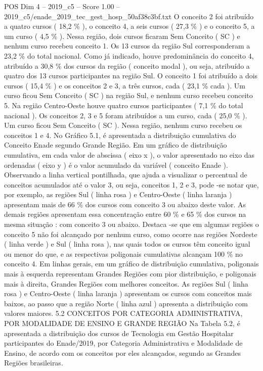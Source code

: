 \begin{textsample}{POS Dim 4 – 2019\_c5 – Score 1.00 – 2019\_c5/enade\_2019\_tec\_gest\_hosp\_50af38c3bf.txt}
O conceito 2 foi atribuído a quatro cursos ( 18,2 \% ), o conceito 4, a seis cursos ( 27,3 \% ) e o conceito 5, a um curso ( 4,5 \% ).
Nessa região, dois cursos ficaram Sem Conceito ( SC ) e nenhum curso recebeu conceito 1.
Os 13 cursos da região Sul corresponderam a 23,2 \% do total nacional.
Como já indicado, houve predominância do conceito 4, atribuído a 30,8 \% dos cursos da região ( conceito modal ), ou seja, atribuído a quatro dos 13 cursos participantes na região Sul.
O conceito 1 foi atribuído a dois cursos ( 15,4 \% ) e os conceitos 2 e 3, a três cursos, cada ( 23,1 \% cada ).
Um curso ficou Sem Conceito ( SC ) na região Sul, e nenhum curso recebeu conceito 5.
Na região Centro-Oeste houve quatro cursos participantes ( 7,1 \% do total nacional ).
Os conceitos 2, 3 e 5 foram atribuídos a um curso, cada ( 25,0 \% ).
Um curso ficou Sem Conceito ( SC ).
Nessa região, nenhum curso recebeu os conceitos 1 e 4.
No Gráfico 5.1, é apresentada a distribuição cumulativa do Conceito Enade segundo Grande Região.
Em um gráfico de distribuição cumulativa, em cada valor de abscissa ( eixo x ), o valor apresentado no eixo das ordenadas ( eixo y ) é o valor acumulado da variável ( conceito Enade ).
Observando a linha vertical pontilhada, que ajuda a visualizar o percentual de conceitos acumulados até o valor 3, ou seja, conceitos 1, 2 e 3, pode -se notar que, por exemplo, as regiões Sul ( linha rosa ) e Centro-Oeste ( linha laranja ) apresentam mais de 66 \% dos cursos com conceito 3 ou abaixo deste valor.
As demais regiões apresentam essa concentração entre 60 \% e 65 \% dos cursos na mesma situação : com conceito 3 ou abaixo.
Destaca -se que em algumas regiões o conceito 5 não foi alcançado por nenhum curso, como ocorre nas regiões Nordeste ( linha verde ) e Sul ( linha rosa ), nas quais todos os cursos têm conceito igual ou menor do que, e as respectivas poligonais cumulativas alcançam 100 \% no conceito 4.
Em linhas gerais, em um gráfico de distribuição cumulativa, poligonais mais à esquerda representam Grandes Regiões com pior distribuição, e poligonais mais à direita, Grandes Regiões com melhores conceitos.
As regiões Sul ( linha rosa ) e Centro-Oeste ( linha laranja ) apresentam os cursos com conceitos mais baixos, ao passo que a região Norte ( linha azul ) apresenta a distribuição com valores maiores. 5.2 CONCEITOS POR CATEGORIA ADMINISTRATIVA, POR MODALIDADE DE ENSINO E GRANDE REGIÃO Na Tabela 5.2, é apresentada a distribuição dos cursos de Tecnologia em Gestão Hospitalar participantes do Enade/2019, por Categoria Administrativa e Modalidade de Ensino, de acordo com os conceitos por eles alcançados, segundo as Grandes Regiões brasileiras.

\end{textsample}
